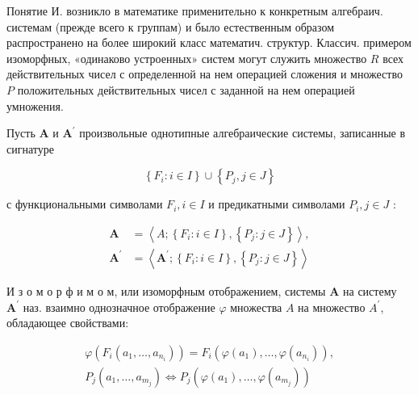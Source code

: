 \documentclass[10pt]{article}
\begin{document}
Понятие И. возникло в математике применительно к конкретным алгебраич. системам (прежде всего к группам) и было естественным образом распространено на более широкий класс математич. структур. Классич. примером изоморфных, «одинаково устроенных» систем могут служить множество $R$ всех действительных чисел с определенной на нем операцией сложения и множество $P$ положительных действительных чисел с заданной на нем операцией умножения.



Пусть $\boldsymbol{A}$ и $\boldsymbol{A}^{\prime}$ произвольные однотипные алгебраические системы, записанные в сигнатуре



\[

\left\{F_{i}: i \in I\right\} \cup\left\{P_{j}, j \in J\right\}

\]



с функциональными символами $F_{i}, i \in I$ и предикатными символами $P_{i}, j \in J$ :



\[

\begin{aligned}

\boldsymbol{A} & =\left\langle A ;\left\{F_{i}: i \in I\right\},\left\{P_{j}: j \in J\right\}\right\rangle, \\

\boldsymbol{A}^{\prime} & =\left\langle\boldsymbol{A}^{\prime} ;\left\{F_{i}: i \in I\right\},\left\{P_{j}: j \in J\right\}\right\rangle

\end{aligned}

\]



И з о м о р ф и м о м, или изоморфным отображением, системы $\boldsymbol{A}$ на систему $\boldsymbol{A}^{\prime}$ наз. взаимно однозначное отображение $\varphi$ множества $A$ на множество $A^{\prime}$, обладающее свойствами:



\[

\begin{gathered}

\varphi\left(F_{i}\left(a_{1}, \ldots, a_{n_{i}}\right)\right)=F_{i}\left(\varphi\left(a_{1}\right), \ldots, \varphi\left(a_{n_{i}}\right)\right), \\

P_{j}\left(a_{1}, \ldots, a_{m_{j}}\right) \Leftrightarrow P_{j}\left(\varphi\left(a_{1}\right), \ldots, \varphi\left(a_{m_{j}}\right)\right)

\end{gathered}

\]
\end{document}
